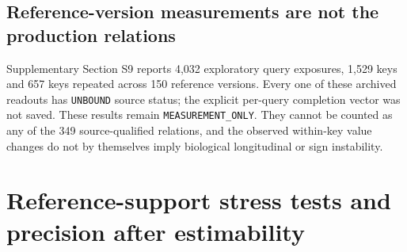 \subsection{Reference-version measurements are not the production relations}
Supplementary Section S9 reports 4,032 exploratory query exposures, 1,529 keys and 657 keys repeated across 150 reference versions. Every one of these archived readouts has \texttt{UNBOUND} source status; the explicit per-query completion vector was not saved. These results remain \texttt{MEASUREMENT\_ONLY}. They cannot be counted as any of the 349 source-qualified relations, and the observed within-key value changes do not by themselves imply biological longitudinal or sign instability.

\section{Reference-support stress tests and precision after estimability}
\label{supp:graph}
